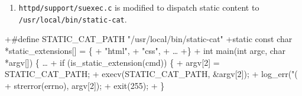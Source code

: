 \begin{frame}[fragile,t]
  \begin{enumerate}
    \addtocounter{enumi}{2}
  \item \texttt{httpd/support/suexec.c} is modified to dispatch static
    content to \texttt{/usr/local/bin/static-cat}.
  \end{enumerate}
\begin{footnotesize}
\begin{semiverbatim}
+#define STATIC_CAT_PATH "/usr/local/bin/static-cat"
+static const char *static_extensions[] = \{
+    "html",
+    "css",
+    \ldots
+\}
+
 int main(int argc, char *argv[])
 \{
     \ldots
+    if (is_static_extension(cmd)) \{
+        argv[2] = STATIC_CAT_PATH;
+        execv(STATIC_CAT_PATH, &argv[2]);
+        log_err("(%
+                strerror(errno), argv[2]);
+        exit(255);
+    \}
\end{semiverbatim}
\end{footnotesize}
\end{frame}
